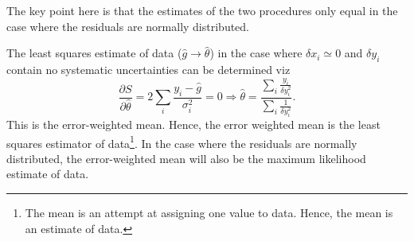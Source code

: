 The key point here is that the estimates of the two procedures only equal in the case where the residuals are normally distributed.
\begin{example}
	The least squares estimate of data ($\hat{g}\rightarrow \hat{\theta}$) in the case where $\delta x_i\simeq 0$ and $\delta y_i$ contain no systematic uncertainties can be determined viz
	\begin{equation}
		\frac{\partial S}{\partial \hat{\theta}}=2\sum_i\frac{y_i-\hat{g}}{\sigma_i^2}=0\Rightarrow \hat{\theta	}=\frac{\sum_i\frac{y_i}{\delta y_i^2}}{\sum_i\frac{1}{\delta y_i^2}}.
	\end{equation}
	This is the error-weighted mean. Hence, the error weighted mean is the least squares estimator of data\footnote{The mean is an attempt at assigning one value to data. Hence, the mean is an estimate of data.}. In the case where the residuals are normally distributed, the error-weighted mean will also be the maximum likelihood estimate of data.
\end{example}
